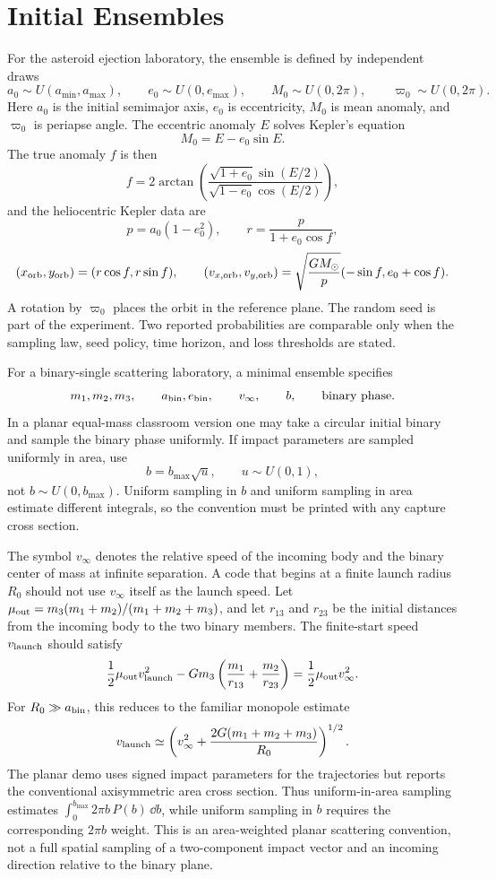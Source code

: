 \section{Initial Ensembles}
\label{sec:three-body-initial-ensembles}

For the asteroid ejection laboratory, the ensemble is defined by independent
draws
\[
        a_0\sim U(a_{\min},a_{\max}),\qquad
        e_0\sim U(0,e_{\max}),\qquad
        M_0\sim U(0,2\pi),\qquad
        \varpi_0\sim U(0,2\pi).
\]
Here \(a_0\) is the initial semimajor axis, \(e_0\) is eccentricity, \(M_0\)
is mean anomaly, and \(\varpi_0\) is periapse angle.  The eccentric anomaly
\(E\) solves Kepler's equation
\[
        M_0=E-e_0\sin E.
\]
The true anomaly \(f\) is then
\[
        f
        =
        2\arctan\left(
        \frac{\sqrt{1+e_0}\sin(E/2)}
             {\sqrt{1-e_0}\cos(E/2)}
        \right),
\]
and the heliocentric Kepler data are
\[
        p=a_0(1-e_0^2),\qquad
        r=\frac{p}{1+e_0\cos f},
\]
\[
        (x_{\rm orb},y_{\rm orb})=(r\cos f,r\sin f),
        \qquad
        (v_{x,{\rm orb}},v_{y,{\rm orb}})
        =
        \sqrt{\frac{GM_\odot}{p}}(-\sin f,e_0+\cos f).
\]
A rotation by \(\varpi_0\) places the orbit in the reference plane.  The
random seed is part of the experiment.  Two reported probabilities are
comparable only when the sampling law, seed policy, time horizon, and loss
thresholds are stated.

For a binary-single scattering laboratory, a minimal ensemble specifies
\[
  m_1,m_2,m_3,\qquad a_{\rm bin},e_{\rm bin},\qquad
  v_\infty,\qquad b,\qquad \text{binary phase}.
\]
In a planar equal-mass classroom version one may take a circular initial binary
and sample the binary phase uniformly.  If impact parameters are sampled
uniformly in area, use
\[
  b=b_{\max}\sqrt u,\qquad u\sim U(0,1),
\]
not \(b\sim U(0,b_{\max})\).  Uniform sampling in \(b\) and uniform sampling in
area estimate different integrals, so the convention must be printed with any
capture cross section.

The symbol \(v_\infty\) denotes the relative speed of the incoming body and the
binary center of mass at infinite separation.  A code that begins at a finite
launch radius \(R_0\) should not use \(v_\infty\) itself as the launch speed.
Let \(\mu_{\rm out}=m_3(m_1+m_2)/(m_1+m_2+m_3)\), and let \(r_{13}\) and
\(r_{23}\) be the initial distances from the incoming body to the two binary
members.  The finite-start speed \(v_{\rm launch}\) should satisfy
\[
  \frac12\mu_{\rm out}v_{\rm launch}^2
  -Gm_3\left(\frac{m_1}{r_{13}}+\frac{m_2}{r_{23}}\right)
  =
  \frac12\mu_{\rm out}v_\infty^2 .
\]
For \(R_0\gg a_{\rm bin}\), this reduces to the familiar monopole estimate
\[
  v_{\rm launch}
  \simeq
  \left(v_\infty^2+\frac{2G(m_1+m_2+m_3)}{R_0}\right)^{1/2}.
\]
The planar demo uses signed impact parameters for the trajectories but reports
the conventional axisymmetric area cross section.  Thus uniform-in-area
sampling estimates \(\int_0^{b_{\max}}2\pi b\,P(b)\,\dd b\), while uniform
sampling in \(b\) requires the corresponding \(2\pi b\) weight.  This is an
area-weighted planar scattering convention, not a full spatial sampling of a
two-component impact vector and an incoming direction relative to the binary
plane.

